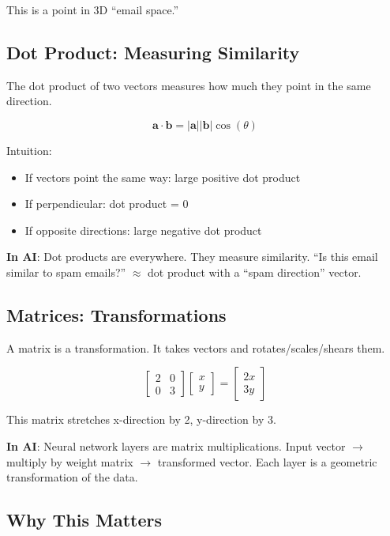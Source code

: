 \documentclass[11pt,oneside]{book}
\begin{document}
This is a point in 3D ``email space.''

\subsection{Dot Product: Measuring Similarity}

The dot product of two vectors measures how much they point in the same direction.

\[
\mathbf{a} \cdot \mathbf{b} = |\mathbf{a}| |\mathbf{b}| \cos(\theta)
\]

Intuition:
\begin{itemize}
\item If vectors point the same way: large positive dot product
\item If perpendicular: dot product = 0
\item If opposite directions: large negative dot product
\end{itemize}

\textbf{In AI}: Dot products are everywhere. They measure similarity. ``Is this email similar to spam emails?'' $\approx$ dot product with a ``spam direction'' vector.

\subsection{Matrices: Transformations}

A matrix is a transformation. It takes vectors and rotates/scales/shears them.

\[
\begin{bmatrix}
2 & 0 \\
0 & 3
\end{bmatrix}
\begin{bmatrix}
x \\
y
\end{bmatrix}
=
\begin{bmatrix}
2x \\
3y
\end{bmatrix}
\]

This matrix stretches x-direction by 2, y-direction by 3.

\textbf{In AI}: Neural network layers are matrix multiplications. Input vector $\rightarrow$ multiply by weight matrix $\rightarrow$ transformed vector. Each layer is a geometric transformation of the data.

\subsection{Why This Matters}
\end{document}
